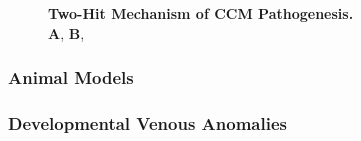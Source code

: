 \begin{figure}[tbp!]
\begin{center}
\end{center}
\caption[Two-Hit Mechanism of CCM Pathogenesis.] {\textbf{Two-Hit Mechanism of CCM Pathogenesis.} \\ \textbf{A},  \textbf{B}, }

\label{CCM_TwoHitIntro}
\end{figure}

\subsubsection{Animal Models}
\subsubsection{Developmental Venous Anomalies}











